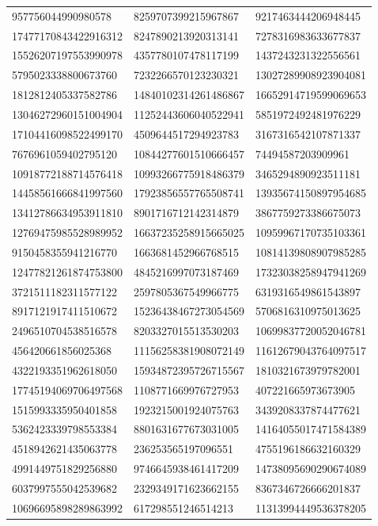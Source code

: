\begin{longtable}{*{3}{l}}
957756044990980578&8259707399215967867&9217463444206948445\\
17477170843422916312&8247890213920313141&7278316983633677837\\
15526207197553990978&4357780107478117199&1437243231322556561\\
5795023338800673760&7232266570123230321&13027289908923904081\\
1812812405337582786&14840102314261486867&16652914719599069653\\
13046272960151004904&11252443606040522941&5851972492481976229\\
17104416098522499170&4509644517294923783&3167316542107871337\\
7676961059402795120&10844277601510666457&74494587203909961\\
10918772188714576418&10993266775918486379&3465294890923511181\\
14458561666841997560&17923856557765508741&13935674150897954685\\
13412786634953911810&8901716712142314879&3867759273386675073\\
12769475985528989952&16637235258915665025&10959967170735103361\\
9150458355941216770&1663681452966768515&10814139808907985285\\
12477821261874753800&4845216997073187469&17323038258947941269\\
3721511182311577122&2597805367549966775&6319316549861543897\\
8917121917411510672&15236438467273054569&5706816310975013625\\
2496510704538516578&8203327015513530203&10699837720052046781\\
456420661856025368&11156258381908072149&11612679043764097517\\
4322193351962618050&15934872395726715567&1810321673979782001\\
17745194069706497568&1108771669976727953&407221665973673905\\
1515993335950401858&1923215001924075763&3439208337874477621\\
5362423339798553384&8801631677673031005&14164055017471584389\\
4518942621435063778&236253565197096551&4755196186632160329\\
4991449751829256880&9746645938461417209&14738095690290674089\\
6037997555042539682&2329349171623662155&8367346726666201837\\
10696695898289863992&617298551246514213&11313994449536378205\\

\end{longtable}
